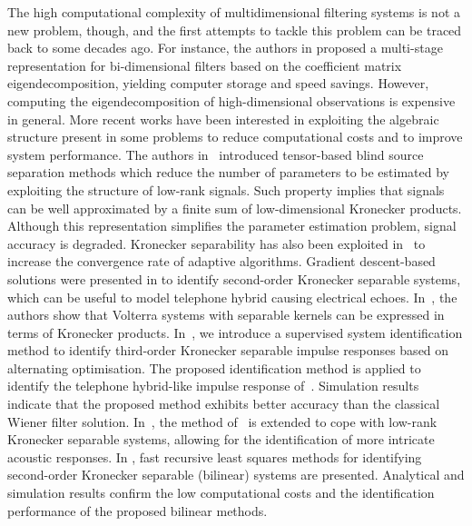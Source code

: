 \documentclass{cta-author}
\begin{document}
The high computational complexity of multidimensional filtering systems is not a new problem, though, and the first attempts to tackle this problem can be traced back to some decades ago. For instance, the authors in \cite{treitel_design_1971} proposed a multi-stage representation for bi-dimensional filters based on the coefficient matrix eigendecomposition, yielding computer storage and speed savings. However, computing the eigendecomposition of high-dimensional observations is expensive in general. More recent works have been interested in exploiting the algebraic structure present in some problems to reduce computational costs and to improve system performance. The authors in~\cite{bousse_tensor-based_2017} introduced tensor-based blind source separation methods which reduce the number of parameters to be estimated by exploiting the structure of low-rank signals. Such property implies that signals can be well approximated by a finite sum of low-dimensional Kronecker products. Although this representation simplifies the parameter estimation problem, signal accuracy is degraded. Kronecker separability has also been exploited in~\cite{rupp_tensor_2015,rupp2015gradient,pinheiro_nonlinear_2016} to increase the convergence rate of adaptive algorithms. Gradient descent-based solutions were presented in \cite{rupp_tensor_2015,rupp2015gradient} to identify second-order Kronecker separable systems, which can be useful to model telephone hybrid causing electrical echoes. In~\cite{pinheiro_nonlinear_2016}, the authors show that Volterra systems with separable kernels can be expressed in terms of Kronecker products. In~\cite{ribeiro2015identification}, we introduce a supervised system identification method to identify third-order Kronecker separable impulse responses based on alternating optimisation. The proposed identification method is applied to identify the telephone hybrid-like impulse response of~\cite{rupp_tensor_2015}. Simulation results indicate that the proposed method exhibits better accuracy than the classical Wiener filter solution. In~\cite{paleologu2018linear}, the method of~\cite{ribeiro2015identification} is extended to cope with low-rank Kronecker separable systems, allowing for the identification of more intricate acoustic responses. In \cite{elisei2018efficient}, fast recursive least squares methods for identifying second-order Kronecker separable (bilinear) systems are presented. Analytical and simulation results confirm the low computational costs and the identification performance of the proposed bilinear methods.
\end{document}
